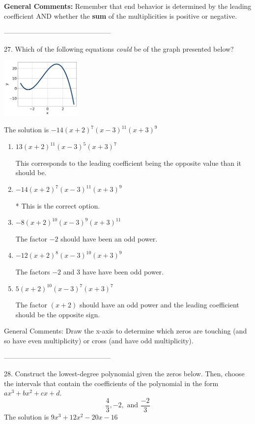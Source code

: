 \documentclass{article}[14pt]
\begin{document}
\textbf{General Comments:} Remember that end behavior is determined by the leading coefficient AND whether the \textbf{sum} of the multiplicities is positive or negative.

-----------------------------------------------

27. Which of the following equations \textit{could} be of the graph presented below?
\begin{center} \includegraphics[width=0.3\textwidth]{../Figures/polyGraphToFunctionB.png} \end{center} 

The solution is $ -14(x + 2)^{7} (x - 3)^{11} (x + 3)^{9} $ 

\begin{enumerate}[label=\Alph*.] 
\item $ 13(x + 2)^{11} (x - 3)^{5} (x + 3)^{7} $ 

 This corresponds to the leading coefficient being the opposite value than it should be. 
\item $ -14(x + 2)^{7} (x - 3)^{11} (x + 3)^{9} $ 

 * This is the correct option. 
\item $ -8(x + 2)^{10} (x - 3)^{9} (x + 3)^{11} $ 

 The factor $-2$ should have been an odd power. 
\item $ -12(x + 2)^{8} (x - 3)^{10} (x + 3)^{9} $ 

 The factors $-2$ and $3$ have have been odd power. 
\item $ 5(x + 2)^{10} (x - 3)^{7} (x + 3)^{7} $ 

 The factor $(x + 2)$ should have an odd power and the leading coefficient should be the opposite sign. 
\end{enumerate} 
 
General Comments: Draw the x-axis to determine which zeros are touching (and so have even multiplicity) or cross (and have odd multiplicity).

-----------------------------------------------

28. Construct the lowest-degree polynomial given the zeros below. Then, choose the intervals that contain the coefficients of the polynomial in the form $ax^3+bx^2+cx+d$.
$$ \frac{4}{3}, -2, \text{ and } \frac{-2}{3} $$ 
The solution is $ 9x^{3} +12 x^{2} -20 x -16 $ 
\end{document}
